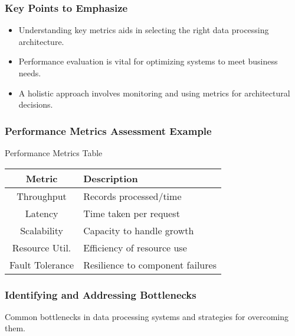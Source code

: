 \documentclass[aspectratio=169]{beamer}
\begin{document}
\begin{frame}[fragile]
    \frametitle{Key Points to Emphasize}
    \begin{itemize}
        \item Understanding key metrics aids in selecting the right data processing architecture.
        \item Performance evaluation is vital for optimizing systems to meet business needs.
        \item A holistic approach involves monitoring and using metrics for architectural decisions.
    \end{itemize}
\end{frame}

\begin{frame}[fragile]
    \frametitle{Performance Metrics Assessment Example}
    \begin{block}{Performance Metrics Table}
        \begin{center}
        \begin{tabular}{|c|l|}
            \hline
            \textbf{Metric} & \textbf{Description} \\
            \hline
            Throughput     & Records processed/time \\
            Latency        & Time taken per request \\
            Scalability    & Capacity to handle growth \\
            Resource Util. & Efficiency of resource use \\
            Fault Tolerance & Resilience to component failures \\
            \hline
        \end{tabular}
        \end{center}
    \end{block}
\end{frame}

\begin{frame}[fragile]
    \frametitle{Identifying and Addressing Bottlenecks}
    Common bottlenecks in data processing systems and strategies for overcoming them.
\end{frame}
\end{document}
